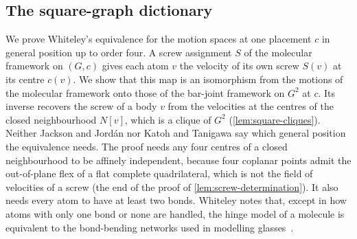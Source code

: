 \subsection{The square-graph dictionary}
\label{sec:molecule-modelling-equivalences}

We prove Whiteley's equivalence for the motion spaces at one placement
$c$ in general position up to order four. A screw assignment $S$ of the
molecular framework on $(G, c)$ gives each atom $v$ the velocity of its
own screw $S(v)$ at its centre $c(v)$. We show that this map is an
isomorphism from the motions of the molecular framework onto those of
the bar-joint framework on $G^2$ at $c$. Its inverse recovers the screw
of a body $v$ from the velocities at the centres of the closed
neighbourhood $N[v]$, which is a clique of $G^2$
(\cref{lem:square-cliques}). Neither Jackson and Jord\'an nor Katoh and
Tanigawa say which general position the equivalence needs. The proof
needs any four centres of a closed neighbourhood to be affinely
independent, because four coplanar points admit the out-of-plane flex of
a flat complete quadrilateral, which is not the field of velocities of a
screw (the end of the proof of \cref{lem:screw-determination}). It also
needs every atom to have at least two bonds. Whiteley notes that, except
in how atoms with only one bond or none are handled, the hinge model of
a molecule is equivalent to the bond-bending networks used in modelling
glasses~\cite[p.~27]{whiteley1999}.

